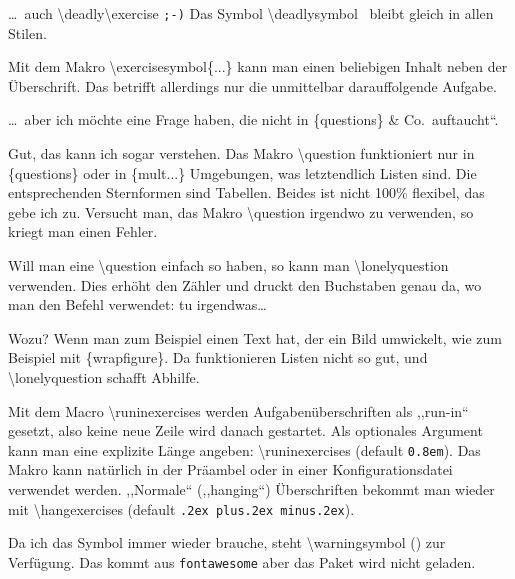 \documentclass[hyperworksheet]{drcschool}
\newcommand*{\cs}[1]{\textup{\ttfamily\textbackslash#1}}                   %
\newcommand*{\oarg}[1]{\textup{\ttfamily[#1]}}                             %
\newcommand*{\env}[1]{\textup{\ttfamily\{#1\}}}                            %
\newcommand*{\param}[1]{\mbox{\normalfont$\langle$\textit{#1}$\rangle$}}   %
\begin{document}
\begin{worksheet*}[title={Schwierigkeitssymbole und sonstige Teilaufgaben},solution=true]
\deadly\exercise
\ldots\ auch \cs{deadly}\cs{exercise} \texttt{;-)} Das Symbol \cs{deadlysymbol} \deadlysymbol\ bleibt gleich in allen Stilen.

\exercisesymbol{$\heartsuit\varheartsuit\heartsuit$}
Mit dem Makro \cs{exercisesymbol\{...\}} kann man einen beliebigen Inhalt neben
der Überschrift. Das betrifft allerdings nur die unmittelbar darauf{}folgende Aufgabe.

\ldots\ aber ich möchte eine Frage haben, die nicht in \env{questions} \& Co.\ auftaucht``.

Gut, das kann ich sogar verstehen. Das Makro \cs{question} funktioniert nur in
\env{questions} oder in \env{mult...} Umgebungen, was letztendlich Listen sind.
Die entsprechenden Sternformen sind Tabellen. Beides ist nicht 100\% flexibel,
das gebe ich zu. Versucht man, das Makro \cs{question} irgendwo zu verwenden,
so kriegt man einen Fehler.

Will man eine \cs{question} einfach so haben, so kann man \cs{lonelyquestion}
verwenden. Dies erhöht den Zähler und druckt den Buchstaben genau da, wo
man den Befehl verwendet: \lonelyquestion tu irgendwas\ldots

\begin{solution}
\answer Wozu? Wenn man zum Beispiel einen Text hat, der ein Bild umwickelt,
wie zum Beispiel mit \env{wrapfigure}. Da funktionieren Listen nicht so gut,
und \cs{lonelyquestion} schafft Abhilfe.
\end{solution}

\runinexercises
{} Mit dem Macro \cs{runinexercises} werden Aufgabenüberschriften
als ,,run-in`` gesetzt, also keine neue Zeile wird danach gestartet. Als optionales
Argument kann man eine explizite Länge angeben: \cs{runinexercises}\oarg{\param{Länge}}
(default \texttt{0.8em}). Das Makro kann natürlich in der Präambel oder in einer
Konfigurationsdatei verwendet werden. ,,Normale`` (,,hanging``) Überschriften
bekommt man wieder mit \cs{hangexercises}\oarg{\param{Länge}} (default \texttt{.2ex plus.2ex minus.2ex}).

Da ich das Symbol immer wieder brauche, steht \cs{warningsymbol} (\warningsymbol)
zur Verfügung. Das kommt aus \texttt{fontawesome} aber das Paket wird nicht geladen.

\end{worksheet*}

\end{document}
